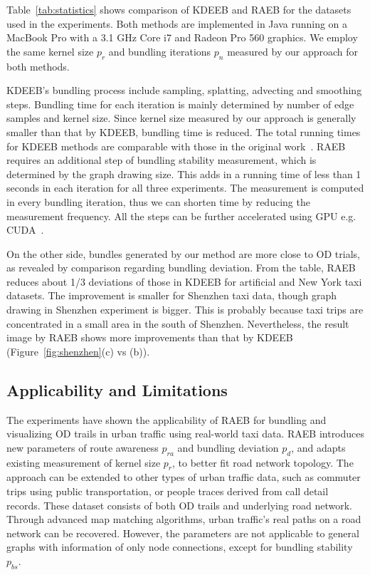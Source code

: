 Table~\ref{tab:statistics} shows comparison of KDEEB and RAEB for the datasets used in the experiments.
Both methods are implemented in Java running on a MacBook Pro with a 3.1 GHz Core i7 and Radeon Pro 560 graphics.
We employ the same kernel size $p_r$ and bundling iterations $p_n$ measured by our approach for both methods.

KDEEB's bundling process include sampling, splatting, advecting and smoothing steps.
Bundling time for each iteration is mainly determined by number of edge samples and kernel size.
Since kernel size measured by our approach is generally smaller than that by KDEEB, bundling time is reduced. 
The total running times for KDEEB methods are comparable with those in the original work~\cite{hurter2012graph}.
RAEB requires an additional step of bundling stability measurement, which is determined by the graph drawing size.
This adds in a running time of less than 1 seconds in each iteration for all three experiments.
The measurement is computed in every bundling iteration, thus we can shorten time by reducing the measurement frequency.
All the steps can be further accelerated using GPU e.g. CUDA~\cite{van2016cubu}.

On the other side, bundles generated by our method are more close to OD trials, as revealed by comparison regarding bundling deviation. 
From the table, RAEB reduces about 1/3 deviations of those in KDEEB for artificial and New York taxi datasets. 
The improvement is smaller for Shenzhen taxi data, though graph drawing in Shenzhen experiment is bigger.
This is probably because taxi trips are concentrated in a small area in the south of Shenzhen.
Nevertheless, the result image by RAEB shows more improvements than that by KDEEB (Figure~\ref{fig:shenzhen}(c) vs (b)). 


\subsection{Applicability and Limitations}
\label{ssec:app}

The experiments have shown the applicability of RAEB for bundling and visualizing OD trails in urban traffic using real-world taxi data.
RAEB introduces new parameters of route awareness $p_{ra}$ and bundling deviation $p_d$, and adapts existing measurement of kernel size $p_r$, to better fit road network topology.
The approach can be extended to other types of urban traffic data, such as commuter trips using public transportation, or people traces derived from call detail records.
These dataset consists of both OD trails and underlying road network.
Through advanced map matching algorithms, urban traffic's real paths on a road network can be recovered.
However, the parameters are not applicable to general graphs with information of only node connections, except for bundling stability $p_{bs}$.

